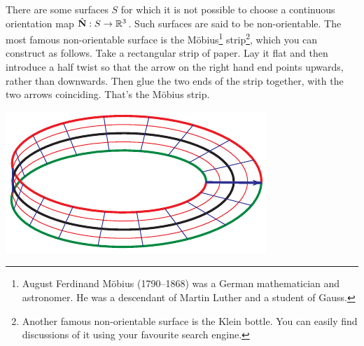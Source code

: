 \begin{eg}\label{eg:orientMobius}
There are some surfaces $S$ for which it is not possible to choose a 
continuous orientation map  $\hat{\mathbf{N}}: S\rightarrow\mathbb{R}^3$. Such surfaces 
are said to be non-orientable. The most famous non-orientable surface
is the M\"obius\footnote{August Ferdinand M\"obius (1790--1868) was a 
German mathematician and astronomer. He was a descendant of Martin Luther
and a student of Gauss.} 
strip\footnote{Another famous non-orientable surface is the Klein bottle.
You can easily find discussions of it using your favourite search engine.}, which you can construct as follows. Take a rectangular
strip of paper. %
Lay it flat and then introduce a half twist so that the arrow on the right hand
end points upwards, rather than downwards. Then glue the two ends of the strip
together, with the two arrows coinciding. That's the M\"obius strip.
\begin{efig}
\begin{center}
     \includegraphics{mobiusB.pdf}
\end{center}
\end{efig}


\end{eg}
